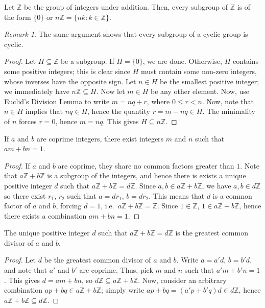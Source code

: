 \documentclass[11pt]{article}
\newcommand{\Z}{\mathbb{Z}}
\theoremstyle{definition}
\theoremstyle{remark}
\newtheorem*{remark}{Remark}
\numberwithin{equation}{section}
\begin{document}
    \begin{theorem}
        Let $\Z$ be the group of integers under addition. Then, every subgroup of
        $\Z$ is of the form $\{0\}$ or $n\Z = \{nk: k \in \Z\}$.
        \begin{remark}
            The same argument shows that every subgroup of a cyclic group is cyclic.
        \end{remark}
    \end{theorem}
    \begin{proof}
        Let $H \subseteq \Z$ be a subgroup. If $H = \{0\}$, we are done. Otherwise,
        $H$ contains some positive integers; this is clear since $H$ must contain
        some non-zero integers, whose inverses have the opposite sign. Let $n \in H$
        be the smallest positive integer; we immediately have $n\Z \subseteq H$. Now
        let $m \in H$ be any other element.  Now, use Euclid's Division Lemma to
        write $m = nq + r$, where $0 \leq r < n$.  Now, note that $n \in H$ implies
        that $nq \in H$, hence the quantity $r = m - nq \in H$. The minimality of $n$
        forces $r = 0$, hence $m = nq$. This gives $H \subseteq n\Z$.
    \end{proof}
    \begin{corollary}
        If $a$ and $b$ are coprime integers, there exist integers $m$ and $n$ such
        that $am + bn = 1$.
    \end{corollary}
    \begin{proof}
        If $a$ and $b$ are coprime, they share no common factors greater than $1$.
        Note that $a\Z + b\Z$ is a subgroup of the integers, and hence there is
        exists a unique positive integer $d$ such that $a\Z + b\Z = d\Z$. Since $a, b
        \in a\Z + b\Z$, we have $a, b \in d\Z$ so there exist $r_1$, $r_2$ such that
        $a = dr_1$, $b = dr_2$. This means that $d$ is a common factor of $a$ and
        $b$, forcing $d = 1$, i.e.\ $a\Z + b\Z = \Z$. Since $1 \in \Z$, $1 \in
        a\Z + b\Z$, hence there exists a combination $am + bn = 1$.
    \end{proof}
    \begin{corollary}
        The unique positive integer $d$ such that $a\Z + b\Z = d\Z$ is the greatest
        common divisor of $a$ and $b$.
    \end{corollary}
    \begin{proof}
        Let $d$ be the greatest common divisor of $a$ and $b$. Write $a = a'd$, $b =
        b'd$, and note that $a'$ and $b'$ are coprime. Thus, pick $m$ and $n$ such
        that $a'm + b'n = 1$. This gives $d = am + bn$, so $d\Z \subseteq a\Z + b\Z$.
        Now, consider an arbitrary combination $ap + bq \in a\Z + b\Z$; simply write
        $ap + bq = (a'p + b'q)d \in d\Z$, hence $a\Z + b\Z \subseteq d\Z$.
    \end{proof}
\end{document}
